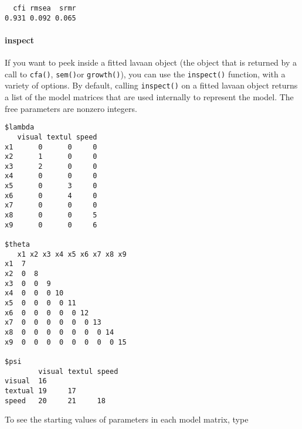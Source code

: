 \begin{verbatim}
  cfi rmsea  srmr 
0.931 0.092 0.065 
\end{verbatim}

\paragraph{inspect}

If you want to peek inside a fitted lavaan object (the object that is
returned by a call to \texttt{cfa()}, \texttt{sem()}or
\texttt{growth()}), you can use the \texttt{inspect()} function, with a
variety of options. By default, calling \texttt{inspect()} on a fitted
lavaan object returns a list of the model matrices that are used
internally to represent the model. The free parameters are nonzero
integers.

\begin{Shaded}
\begin{Highlighting}[]
\StringTok{ } 
\end{Highlighting}
\end{Shaded}

\begin{verbatim}
$lambda
   visual textul speed
x1      0      0     0
x2      1      0     0
x3      2      0     0
x4      0      0     0
x5      0      3     0
x6      0      4     0
x7      0      0     0
x8      0      0     5
x9      0      0     6

$theta
   x1 x2 x3 x4 x5 x6 x7 x8 x9
x1  7                        
x2  0  8                     
x3  0  0  9                  
x4  0  0  0 10               
x5  0  0  0  0 11            
x6  0  0  0  0  0 12         
x7  0  0  0  0  0  0 13      
x8  0  0  0  0  0  0  0 14   
x9  0  0  0  0  0  0  0  0 15

$psi
        visual textul speed
visual  16                 
textual 19     17          
speed   20     21     18   
\end{verbatim}

To see the starting values of parameters in each model matrix, type

\begin{Shaded}
\begin{Highlighting}[]
 \NormalTok{)}
\end{Highlighting}
\end{Shaded}

